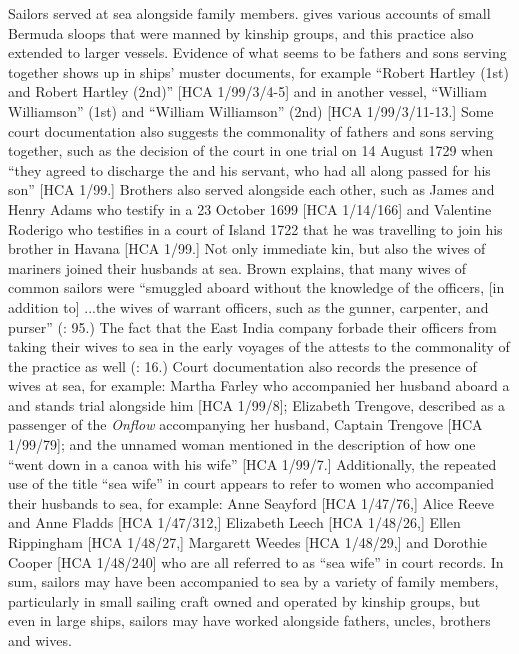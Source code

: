   Sailors served at sea alongside family members. \citet{Jarvis2010} gives various accounts of small Bermuda sloops that were manned by kinship groups, and this practice also extended to larger vessels. Evidence of what seems to be fathers and sons serving together shows up in ships’ muster documents, for example “Robert Hartley (1st) and Robert Hartley (2nd)” [HCA 1/99/3/4-5] and in another vessel, “William Williamson” (1st) and “William Williamson” (2nd) [HCA 1/99/3/11-13.] Some court documentation also suggests the commonality of fathers and sons serving together, such as the decision of the court in one  trial on 14 August {1729} when “they agreed to discharge the  and his servant, who had all along passed for his son” [HCA 1/99.]  Brothers also served alongside each other, such as James and Henry Adams who testify in a  23 October {1699} [HCA 1/14/166] and Valentine Roderigo who testifies in a court of  Island 1722 that he was travelling to join his brother in Havana [HCA 1/99.] Not only immediate kin, but also the wives of mariners joined their husbands at sea. Brown explains, that many wives of common sailors were “smuggled aboard without the knowledge of the officers, [in addition to] ...the wives of warrant officers, such as the gunner, carpenter, and purser” (\citealt{Brown2011}: 95.) The fact that the East India company forbade their officers from taking their wives to sea in the early voyages of the  attests to the commonality of the practice as well (\citealt{Fury2015}: 16.) Court documentation also records the presence of wives at sea, for example: Martha Farley who accompanied her husband aboard a  and stands trial alongside him [HCA 1/99/8]; Elizabeth Trengove, described as a passenger of the \textit{Onflow} accompanying her husband, Captain Trengove [HCA 1/99/79]; and the unnamed woman mentioned in the description of how one  “went down in a canoa with his wife” [HCA 1/99/7.] Additionally, the repeated use of the title “sea wife” in court appears to refer to women who accompanied their husbands to sea, for example: Anne Seayford [HCA 1/47/76,] Alice Reeve and Anne Fladds [HCA 1/47/312,] Elizabeth Leech [HCA 1/48/26,] Ellen Rippingham [HCA 1/48/27,] Margarett Weedes [HCA 1/48/29,] and Dorothie Cooper [HCA 1/48/240] who are all referred to as “sea wife” in court records. In sum, sailors may have been accompanied to sea by a variety of family members, particularly in small sailing craft owned and operated by kinship groups, but even in large ships, sailors may have worked alongside fathers, uncles, brothers and wives. 

